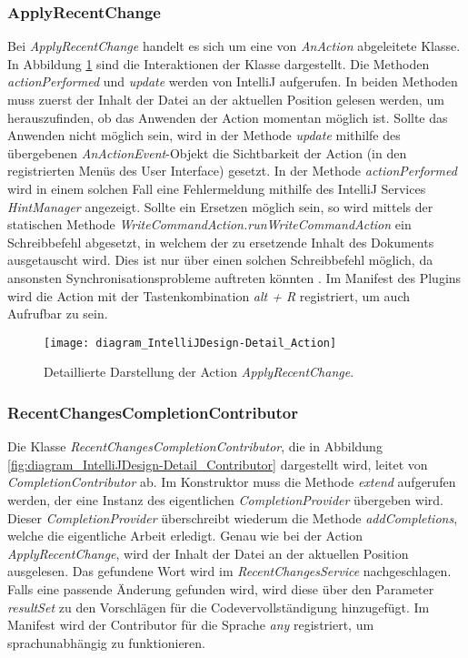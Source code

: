 \subsubsection{ApplyRecentChange}

Bei \emph{ApplyRecentChange} handelt es sich um eine von
\emph{AnAction} abgeleitete Klasse. In Abbildung
\ref{fig:diagram_IntelliJDesign-Detail_Action} sind die Interaktionen
der Klasse dargestellt. Die Methoden \emph{actionPerformed} und \emph{update}
werden von IntelliJ aufgerufen. In beiden Methoden muss zuerst
der Inhalt der Datei an der aktuellen Position gelesen werden, um 
herauszufinden, ob das Anwenden der Action momentan möglich ist.
Sollte das Anwenden nicht möglich sein, wird
in der Methode \emph{update} mithilfe des übergebenen
\emph{AnActionEvent}-Objekt die Sichtbarkeit der Action (in den
registrierten Menüs des User Interface) gesetzt.
In der Methode \emph{actionPerformed} wird in einem solchen Fall
eine Fehlermeldung mithilfe des IntelliJ Services \emph{HintManager}
angezeigt. Sollte ein Ersetzen möglich sein,
so wird mittels der statischen Methode 
\emph{WriteCommandAction.runWriteCommandAction} ein Schreibbefehl
abgesetzt, in welchem der zu ersetzende Inhalt des Dokuments 
ausgetauscht wird. Dies ist nur über einen solchen Schreibbefehl möglich,
da ansonsten Synchronisationsprobleme auftreten könnten
\cite{IntelliJPlatformSDKSafelyReplacingText,IntelliJPlatformSDKGeneralThreadingRules}.
Im Manifest des Plugins wird die Action mit der 
Tastenkombination \emph{alt + R} registriert, um
auch Aufrufbar zu sein.

\begin{figure}
    \centering
    \texttt{[image: diagram\_IntelliJDesign-Detail\_Action]}
    \caption{Detaillierte Darstellung der Action \emph{ApplyRecentChange}.}
    \label{fig:diagram_IntelliJDesign-Detail_Action}
\end{figure}

\subsubsection{RecentChangesCompletionContributor}

Die Klasse \emph{RecentChangesCompletionContributor}, die in Abbildung
\ref{fig:diagram_IntelliJDesign-Detail_Contributor} dargestellt wird,
leitet von \emph{CompletionContributor} ab. Im Konstruktor muss
die Methode \emph{extend} aufgerufen werden, der eine Instanz 
des eigentlichen \emph{CompletionProvider} übergeben wird.
Dieser \emph{CompletionProvider} überschreibt wiederum die 
Methode \emph{addCompletions}, welche die eigentliche Arbeit erledigt.
Genau wie bei der Action \emph{ApplyRecentChange}, wird der
Inhalt der Datei an der aktuellen Position ausgelesen. Das gefundene
Wort wird im \emph{RecentChangesService} nachgeschlagen.
Falls eine passende Änderung gefunden wird, wird diese über den 
Parameter \emph{resultSet} zu den Vorschlägen für die Codevervollständigung
hinzugefügt.
Im Manifest wird der Contributor für die Sprache \emph{any} registriert,
um sprachunabhängig zu funktionieren.

